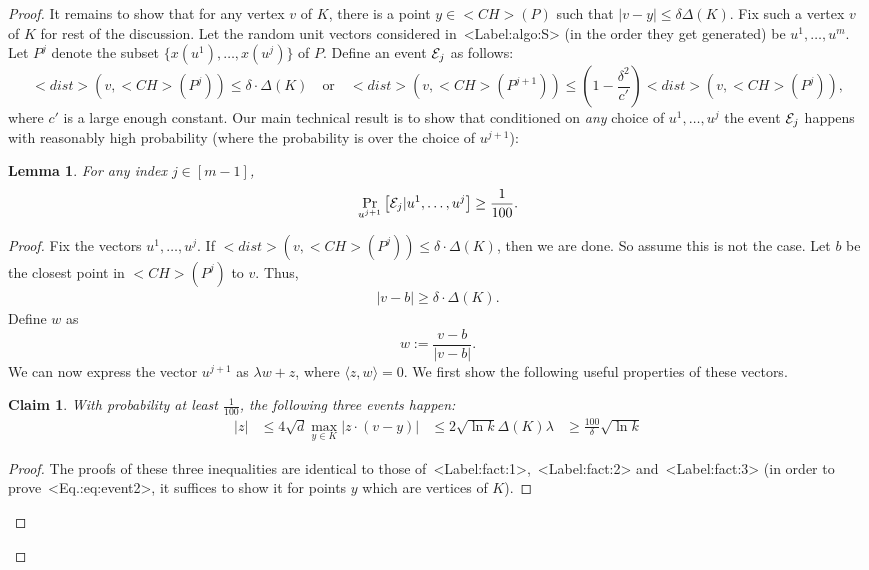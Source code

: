 \documentclass[11pt,letterpaper]{article}
\newcounter{note}[section]
\def\\{}%
\def\mathsf#1{<#1>}%
\def\Cref#1{<Label:#1>}%
\def\eqref#1{<Eq.:#1>}%
\newtheorem{lemma}[theorem]{Lemma}
\newtheorem{claim}[theorem]{Claim}
\theoremstyle{definition}
\theoremstyle{remark}
\newcommand{\CH}{{\mathsf {CH}}}
\newcommand{\dist}{{\mathsf{dist}}}
\newcommand{\cE}{{\cal E}}
\begin{document}
\begin{proof}
It remains to show that for any vertex $v$ of $K$, there is a point $y \in \CH(P)$ such that $|v-y| \leq \delta \Delta(K)$. Fix such a vertex $v$ of $K$ for rest of the discussion. Let the random unit vectors considered  in~\Cref{algo:S} (in the order they get generated) be $u^1, \ldots, u^m$. Let $P^j$ denote the subset $\{x(u^1), \ldots, x(u^j)\}$ of $P$. Define an event $\cE_j$ as follows:
$$ \dist(v, \CH(P^j)) \leq \delta \cdot \Delta(K) \quad \mbox{or} \quad \dist(v, \CH(P^{j+1})) \leq \left(1 - \frac{\delta^2}{c'} \right) \dist(v, \CH(P^j)),$$
where $c'$ is a large enough constant. Our main technical result is to show that conditioned on {\em any} choice of $u^1, \ldots, u^j$ the event $\cE_j$ happens with reasonably high probability (where the probability is over the choice of $u^{j+1}$)$:$
\begin{lemma}
    \label{lem:tech1}
    For any index $j \in [m-1]$, 
    $$ \Pr_{u^{j+1}} \left[\cE_j|u^1, \ldots, u^j \right] \geq \frac{1}{100}. $$
\end{lemma}
\begin{proof}
    Fix the vectors $u^1, \ldots, u^j$. If $\dist(v, \CH(P^j)) \leq \delta \cdot \Delta(K)$, then we are done. So assume this is not the case. Let $b$ be the closest point in $\CH(P^j)$ to $v$. Thus, 
    \begin{align}
        \label{eq:b}
        |v-b| \geq \delta \cdot \Delta(K).
    \end{align}Define $w$ as $$ w:= \frac{v-b}{|v-b|}.$$
 We can now express the vector $u^{j+1}$ as $\lambda w + z$, where $\langle z, w \rangle = 0$. We first show the following useful properties of these vectors. 

 \begin{claim}
     \label{cl:tech2}
     With probability at least $\frac{1}{100}$, the following three events happen:
     \begin{align}
         |z| & \leq 4 \sqrt{d} \label{eq:event1} \\
         \max_{y \in K} |z \cdot (v-y)| & \leq 2 \sqrt{\ln k} \Delta(K) \label{eq:event2} \\
         \lambda & \geq \frac{100}{\delta} \sqrt{\ln k} \label{eq:event3}
     \end{align}
 \end{claim}
    \begin{proof}
        The proofs of these three inequalities are identical to those of~\Cref{fact:1},~\Cref{fact:2} and~\Cref{fact:3} (in order to prove~\eqref{eq:event2}, it suffices to show it for points $y$ which are vertices of $K$). 
    \end{proof}


\end{proof}
\end{proof}
\end{document}
